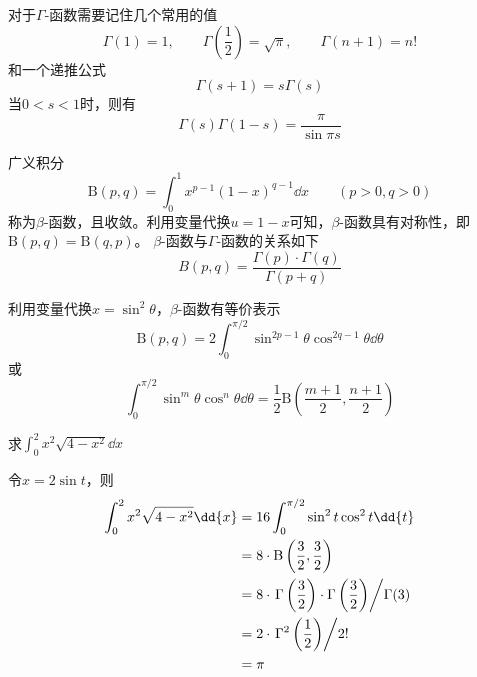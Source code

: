 对于$\Gamma$-函数需要记住几个常用的值
\[ \Gamma(1)=1,\qquad \Gamma\left(\frac{1}{2}\right)=\sqrt{\pi},\qquad\Gamma(n+1)=n! \]
和一个递推公式
\[ \Gamma(s+1) = s\Gamma(s) \]
当$0<s<1$时，则有
\[ \Gamma(s)\Gamma(1-s) = \frac{\pi}{\sin \pi s} \]

广义积分
\[ \mathrm{B}(p,q) = \int_0^1 x^{p-1}(1-x)^{q-1}\dd{x} \qquad (p>0,q>0) \]
称为$\beta$-函数，且收敛。利用变量代换$u=1-x$可知，$\beta$-函数具有对称性，即$\mathrm{B}(p,q)=\mathrm{B}(q,p)$。
$\beta$-函数与$\Gamma$-函数的关系如下
\[ B(p,q) = \frac{\Gamma(p)\cdot\Gamma(q)}{\Gamma(p+q)} \]

利用变量代换$x=\sin^2\theta$，$\beta$-函数有等价表示
\[ \mathrm{B}(p,q) = 2\int_0^{\pi/2}\sin^{2p-1}\theta\cos^{2q-1}\theta\dd{\theta} \]
或
\[ \int_0^{\pi/2} \sin^m\theta\cos^n\theta\dd{\theta} = \frac{1}{2}\mathrm{B}(\frac{m+1}{2},\frac{n+1}{2}) \]

\begin{example}
    求$\displaystyle\int_0^2x^2\sqrt{4-x^2}\dd{x}$
\end{example}
\begin{solution}
    令$x=2\sin t$，则
    \begin{align*}
        \int_0^2x^2\sqrt{4-x^2}\dd{x} & = 16\int_0^{\pi/2} \sin^2 t\cos^2 t\dd{t}                                                                 \\
                                      & = 8 \cdot \mathrm{B}\left(\frac{3}{2},\frac{3}{2}\right)                                                  \\
                                      & = 8 \cdot \left.\Gamma\left(\frac{3}{2}\right)\cdot\Gamma\left(\frac{3}{2}\right)\middle/\Gamma(3)\right. \\
                                      & = 2 \cdot \left.\Gamma^2\left(\frac{1}{2}\right)\middle/ 2!\right.                                        \\
                                      & = \pi
    \end{align*}
\end{solution}

